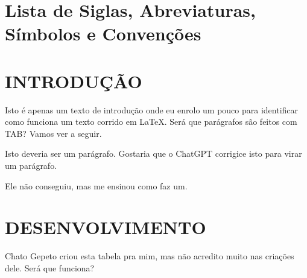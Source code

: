 \documentclass{article}
\renewcommand{\headrulewidth}{0pt} %
\renewcommand{\footrulewidth}{0pt} %
\begin{document}
\listoffigures
\newpage

\listoftables
\newpage

\section*{Lista de Siglas, Abreviaturas, Símbolos e Convenções}

\clearpage
{} %
\setcounter{page}{1}
\setcounter{section}{0} %

\pagestyle{fancy}
\renewcommand{\headrulewidth}{0pt} %
\renewcommand{\footrulewidth}{0pt} %


\section{INTRODUÇÃO}
Isto é apenas um texto de introdução onde eu enrolo um pouco para identificar como funciona um texto corrido em LaTeX. Será que parágrafos são feitos com TAB? Vamos ver a seguir. 

Isto deveria ser um parágrafo. Gostaria que o ChatGPT corrigice isto para virar um parágrafo.

Ele não conseguiu, mas me ensinou como faz um.

\newpage

\section{DESENVOLVIMENTO}
Chato Gepeto criou esta tabela pra mim, mas não acredito muito nas criações dele. Será  que funciona?
\end{document}
